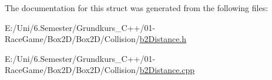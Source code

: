 The documentation for this struct was generated from the following files\+:\begin{DoxyCompactItemize}
\item 
E\+:/\+Uni/6.\+Semester/\+Grundkurs\+\_\+\+C++/01-\/\+Race\+Game/\+Box2\+D/\+Box2\+D/\+Collision/\mbox{\hyperlink{b2_distance_8h}{b2\+Distance.\+h}}\item 
E\+:/\+Uni/6.\+Semester/\+Grundkurs\+\_\+\+C++/01-\/\+Race\+Game/\+Box2\+D/\+Box2\+D/\+Collision/\mbox{\hyperlink{b2_distance_8cpp}{b2\+Distance.\+cpp}}\end{DoxyCompactItemize}
